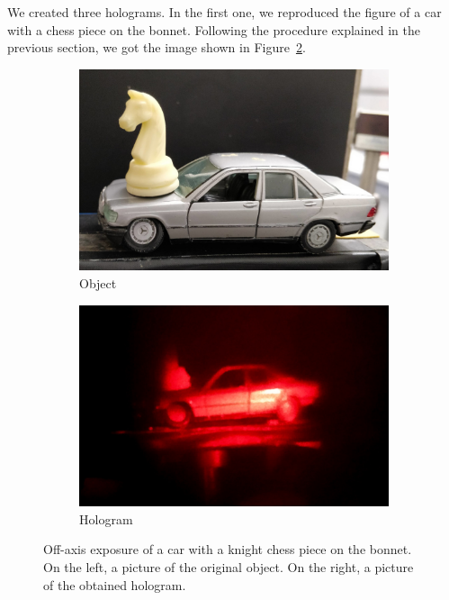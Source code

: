 \documentclass[11pt,a4paper]{article}
\begin{document}
We created three holograms. In the first one, we reproduced the figure of a car with a chess piece on the bonnet. Following the procedure explained in the previous section, we got the image shown in Figure~\ref{fig:off_axis_hologram1}.
\begin{figure}[ht]
\centering
\begin{subfigure}[b]{0.45\textwidth}
\includegraphics[width=\textwidth]{car_knight}
\caption{Object}
\label{fig:car_knight1}
\end{subfigure}
\begin{subfigure}[b]{0.45\textwidth}
\includegraphics[width=\textwidth]{Off-axis_hologram}
\caption{Hologram}
\label{fig:off_axis_hologram1}
\end{subfigure}
\caption{Off-axis exposure of a car with a knight chess piece on the bonnet. On the left, a picture of the original object. On the right, a picture of the obtained hologram.}
\label{fig:off-axis_exposure}
\end{figure}
\end{document}
